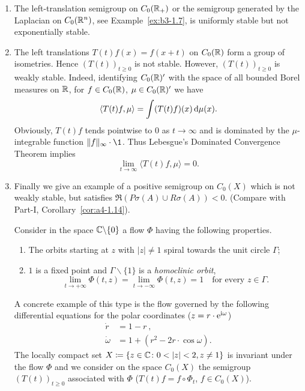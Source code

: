 \begin{example}\label{ex:b4-1.2}
%
%
\begin{enumerate}[\upshape (i), wide, labelindent=.25em]
\item
The left-translation semigroup on $C_{0}(\mathbb{R}_+)$ or the semigroup generated by the Laplacian on $C_{0}(\mathbb{R}^n)$, see Example~\ref{ex:b3-1.7}, is uniformly stable but not exponentially stable.

\item 
The left translations $T(t)f(x) = f(x+t)$ on $C_{0}(\mathbb{R})$ form a group of isometries. 
Hence $(T(t))_{t \geq 0}$ is not stable. 
However, $(T(t))_{t \geq 0}$ is weakly stable. 
Indeed, identifying $C_{0}(\mathbb{R})'$ with the space of all bounded Borel measures on $\mathbb{R}$, for $f \in C_{0}(\mathbb{R})$, $\mu \in C_{0}(\mathbb{R})'$ we have
\[
   \langle T(t)f,\mu \rangle = \int (T(t)f)(x) \mathop{}\!\mathrm{d}{\mu}(x) .
\]
Obviously, $T(t)f$ tends pointwise to $0$ as $t \to \infty$ and is dominated by the $\mu$-integrable function $\|f\|_\infty \cdot \1$. 
Thus Lebesgue's Dominated Convergence Theorem implies
\[ 
\lim_{t\to\infty} \langle T(t)f,\mu \rangle = 0.
\]

\item 
Finally we give an example of a positive semigroup on $C_{0}(X)$ which is not weakly stable, but satisfies $\Re (P\sigma(A) \cup R\sigma(A)) < 0$. (Compare with Part-I, Corollary~\ref{cor:a4-1.14}).

Consider in the space $\mathbb{C}\backslash\{0\}$ a flow $\Phi$ having the following properties.%
\begin{enumerate}[--]
	\item 
	The orbits starting at $z$ with $|z| \neq 1$ spiral towards the unit circle $\Gamma$;
	
	\item 
	$1$ is a fixed point and $\Gamma\backslash\{1\}$ is a \emph{homoclinic orbit}, \ie
    \[
    \lim_{t\to+\infty} \Phi(t,z) = \lim_{t\to-\infty} \Phi(t,z) = 1 \quad \text{for every $z \in \Gamma$.}
    \]
\end{enumerate}
A concrete example of this type is the flow governed by the following differential equations for the polar coordinates (\ie $z = r\cdot \mathrm{e}^{\mathrm{i}\omega}$)
\begin{align*}
   \dot{r} &= 1 - r~,\\
   \dot{\omega} &= 1 + (r^2 - 2r\cdot\cos \omega) .
\end{align*}
The locally compact set $X \coloneq
 \{z \in \mathbb{C} \colon 0  <  |z|  <  2, z \neq 1\}$ is invariant under the flow $\Phi$ and we consider on the space $C_{0}(X)$ the semigroup $(T(t))_{t \geq 0}$ associated with $\Phi$ (\ie $T(t)f = f\circ\Phi_t$, $f \in C_{0}(X)$). 
 

\end{enumerate}
\end{example}
